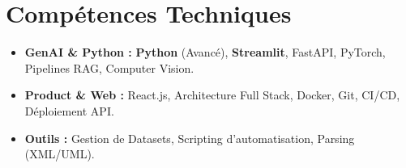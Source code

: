 \documentclass[a4paper,11pt]{article}
\begin{document}
\section{Compétences Techniques}
\begin{itemize}[leftmargin=*, nosep]
    \item \small{\textbf{GenAI \& Python :} \textbf{Python} (Avancé), \textbf{Streamlit}, FastAPI, PyTorch, Pipelines RAG, Computer Vision.}
    \item \small{\textbf{Product \& Web :} React.js, Architecture Full Stack, Docker, Git, CI/CD, Déploiement API.}
    \item \small{\textbf{Outils :} Gestion de Datasets, Scripting d'automatisation, Parsing (XML/UML).}
\end{itemize}

\end{document}
